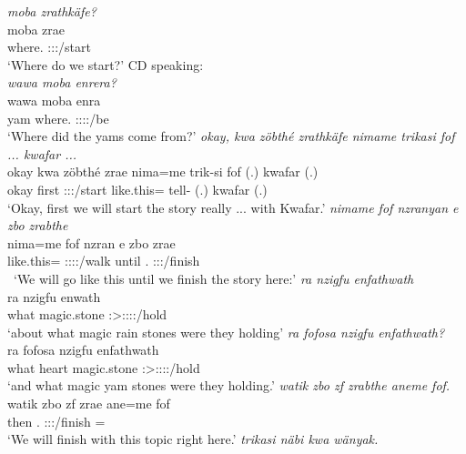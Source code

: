 \clearpage
\begin{exe}
	\emph{moba zrathkäfe?}\\
	\gll moba zrae\\ 
	where.\Abl{} \Fdu:\Sbj:\Irr:\Pfv/start\\
	\trans `Where do we start?'
	{\footnotesize{CD speaking:}}\\
	\emph{wawa moba enrera?}\\
	\gll wawa moba enra\\ 
	yam where.\Abl{} \Stpl:\Pl:\Pst:\Ipfv:\Venit/be\\
	\trans `Where did the yams come from?'
	\emph{okay, kwa zöbthé zrathkäfe nimame trikasi fof ... kwafar ...}\\
	\gll okay kwa zöbthé zrae nima=me trik-si fof (.) kwafar (.)\\ 
	okay \Fut{} first \Fdu:\Sbj:\Irr:\Pfv/start like.this=\Ins{} tell-\Nmlz{} \Emph{} (.) kwafar (.)\\
	\trans `Okay, first we will start the story really ... with Kwafar.'
	\emph{nimame fof nzranyan e zbo zrabthe}\\
	\gll nima=me fof nzran e zbo zrae\\ 
	like.this=\Ins{} \Emph{} \Fdu:\Sbj:\Irr:\Ipfv:\Venit/walk until \Prox.\All{} \Fdu:\Sbj:\Irr:\Pfv/finish\\\
	\trans `We will go like this until we finish the story here:'
	\emph{ra nzigfu enfathwath}\\
	\gll ra nzigfu enwath\\ 
	what magic.stone \Stpl:\Sbj>\Stpl:\Obj:\Pst:\Ipfv:\Venit/hold\\
	\trans `about what magic rain stones were they holding'
	\emph{ra fofosa nzigfu enfathwath?}\\
	\gll ra fofosa nzigfu enfathwath\\ 
	what heart magic.stone \Stpl:\Sbj>\Stpl:\Obj:\Pst:\Ipfv:\Venit/hold\\
	\trans `and what magic yam stones were they holding.'
	\emph{watik zbo zf zrabthe aneme fof.}\\
	\gll watik zbo zf zrae ane=me fof\\ 
	then \Prox.\All{} \Imm{} \Fdu:\Sbj:\Irr:\Pfv/finish \Dem=\Ins{} \Emph{}\\
	\trans `We will finish with this topic right here.'
	\emph{trikasi näbi kwa wänyak.}\\

\end{exe}
